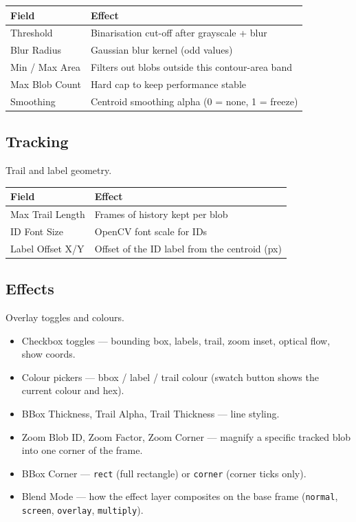 \documentclass[11pt,a4paper,openany]{report}
\begin{document}
\begin{tabularx}{\linewidth}{@{}lX@{}}
    \toprule
    \textbf{Field} & \textbf{Effect} \\
    \midrule
    Threshold     & Binarisation cut-off after grayscale + blur \\
    Blur Radius   & Gaussian blur kernel (odd values) \\
    Min / Max Area & Filters out blobs outside this contour-area band \\
    Max Blob Count & Hard cap to keep performance stable \\
    Smoothing     & Centroid smoothing alpha (0 = none, 1 = freeze) \\
    \bottomrule
\end{tabularx}

\subsection{Tracking}
Trail and label geometry.

\begin{tabularx}{\linewidth}{@{}lX@{}}
    \toprule
    \textbf{Field} & \textbf{Effect} \\
    \midrule
    Max Trail Length     & Frames of history kept per blob \\
    ID Font Size         & OpenCV font scale for IDs \\
    Label Offset X/Y     & Offset of the ID label from the centroid (px) \\
    \bottomrule
\end{tabularx}

\subsection{Effects}
Overlay toggles and colours.

\begin{itemize}
    \item Checkbox toggles --- bounding box, labels, trail, zoom inset,
        optical flow, show coords.
    \item Colour pickers --- bbox / label / trail colour (swatch button
        shows the current colour and hex).
    \item BBox Thickness, Trail Alpha, Trail Thickness --- line styling.
    \item Zoom Blob ID, Zoom Factor, Zoom Corner --- magnify a specific
        tracked blob into one corner of the frame.
    \item BBox Corner --- \texttt{rect} (full rectangle) or \texttt{corner}
        (corner ticks only).
    \item Blend Mode --- how the effect layer composites on the base frame
        (\texttt{normal}, \texttt{screen}, \texttt{overlay}, \texttt{multiply}).
\end{itemize}
\end{document}
